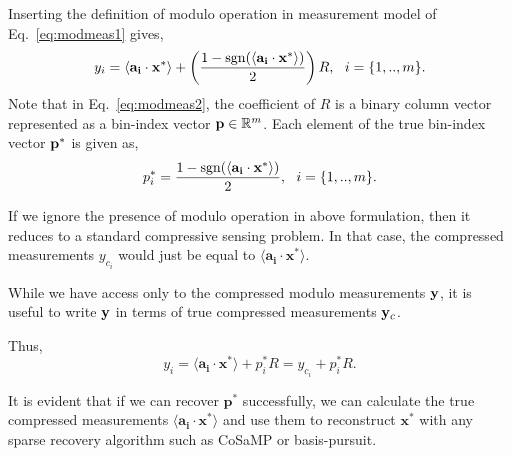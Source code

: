 Inserting the definition of modulo operation in measurement model of Eq.~\ref{eq:modmeas1} gives,
\begin{equation}
y_i= \langle \mathbf{a_i} \cdot \mathbf{x^*} \rangle+\left( \frac{1-\sgn(\langle \mathbf{a_i} \cdot \mathbf{x^*} \rangle)}{2}\right)R,~~i = \{1,..,m\}.
\label{eq:modmeas2}
\end{equation} 
Note that in Eq.~\ref{eq:modmeas2}, the coefficient of $R$ is a binary column vector represented as a bin-index vector $\mathbf{p} \in {\mathbb{R}}^m$. Each element of the true bin-index vector $\mathbf{p}^*$ is given as,
$$
p^*_i = \frac{1-\mathrm{sgn}(\langle \mathbf{a_i} \cdot \mathbf{x^*} \rangle)}{2},~~i = \{1,..,m\}.
$$


If we ignore the presence of modulo operation in above formulation, then it reduces to a standard compressive sensing problem. In that case, the compressed measurements $y_{c_i}$ would just be equal to $\langle \mathbf{a_i} \cdot \mathbf{x^*} \rangle$.    %

While we have access only to the compressed modulo measurements $\mathbf{y}$, it is useful to write $\mathbf{y}$ in terms of true compressed measurements $\mathbf{y}_c$. 

Thus,
$$
y_i = \langle \mathbf{a_i} \cdot \mathbf{x^*} \rangle + p^*_iR = y_{c_i}+p^*_iR.
$$

It is evident that if we can recover $\mathbf{p^*}$ successfully, we can calculate the true compressed measurements $\langle \mathbf{a_i} \cdot \mathbf{x^*} \rangle$ and use them to reconstruct $\mathbf{x^*}$ with any sparse recovery algorithm such as CoSaMP or basis-pursuit.
